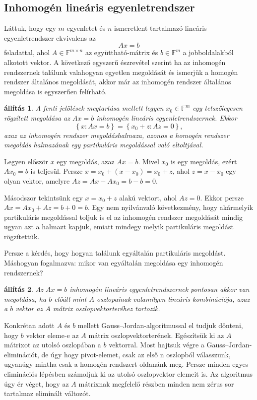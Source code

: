 \documentclass[9pt, a4paper, showtrims]{memoir}
\makeatletter
\renewenvironment{proof}[1][\proofname]
    {\par\pushQED{\qed}%
    \normalfont \topsep6\p@\@plus6\p@\relax
    \trivlist
    \item[\hskip\labelsep
        \itshape
    #1\@addpunct{:}]\ignorespaces}
    {\popQED\endtrivlist\@endpefalse}
\theoremstyle{plain}
\newtheorem{proposition}{állítás}[chapter]
\theoremstyle{remark}
\theoremstyle{definition}
\makeatother
\begin{document}
\subsection{Inhomogén lineáris egyenletrendszer}
Láttuk, hogy egy $m$ egyenletet és $n$ ismeretlent tartalmazó lineáris egyenletrendszer ekvivalens az 
\[
    Ax=b
\]
feladattal, ahol $A\in\mathbb{F}^{m\times n}$ az együttható-mátrix és $b\in\mathbb{F}^m$
a jobboldalakból alkotott vektor.
A következő egyszerű észrevétel szerint ha az inhomogén rendszernek találunk valahogyan egyetlen megoldását és ismerjük a homogén rendszer általános megoldását,
akkor már az inhomogén rendszer általános megoldása is egyszerűen felírható.
\begin{proposition}
    A fenti jelölések megtartása mellett
    legyen $x_0\in\mathbb{F}^m$ egy tetszőlegesen rögzített megoldása az $Ax=b$ inhomogén lineáris egyenletrendszernek.
    Ekkor
    \[
        \left\{ x:Ax=b \right\}
        =
        \left\{ x_0+z:Az=0 \right\},
    \]
    azaz az inhomogén rendszer megoldáshalmaza, 
    azonos a homogén rendszer megoldás halmazának egy partikuláris megoldással való 
    eltoltjával.
\end{proposition}
\begin{proof}
    Legyen először $x$ egy megoldás, azaz $Ax=b$. 
    Mivel $x_0$ is egy megoldás, ezért $Ax_{0}=b$ is teljesül.
    Persze $x=x_0+\left( x-x_0 \right)=x_0+z$, ahol $z=x-x_0$ egy olyan vektor,
    amelyre $Az=Ax-Ax_0=b-b=0$.

    Másodszor tekintsünk egy $x=x_0+z$ alakú vektort, ahol $Az=0$.
    Ekkor persze $Ax=Ax_0+Az=b+0=b$.
\end{proof}
Egy nem nyilvánvaló következmény, 
hogy akármelyik partikuláris megoldással toljuk is el az
inhomogén rendszer megoldását mindig ugyan azt a halmazt kapjuk, 
emiatt mindegy melyik partikuláris megoldást rögzítettük.

Persze a kérdés, hogy hogyan találunk egyáltalán partikuláris megoldást.
Máshogyan fogalmazva: mikor van egyáltalán megoldása egy inhomogén rendszernek?
\begin{proposition}
    Az $Ax=b$ inhomogén lineáris egyenletrendszernek pontosan akkor van megoldása, 
    ha $b$ előáll mint $A$ oszlopainak valamilyen lineáris kombinációja, 
    azaz a $b$ vektor az $A$ mátrix oszlopvektorteréhez tartozik.
\end{proposition}
Konkrétan adott $A$ és $b$ mellett Gauss--Jordan-algoritmussal  el tudjuk dönteni, hogy
$b$ vektor eleme-e az $A$ mátrix oszlopvektorterének.
Egészítsük ki az $A$ mátrixot az utolsó oszlopában a $b$ vektorral.
Most hajtsuk végre a Gauss--Jordan-eliminációt, de úgy hogy pivot-elemet,
csak az első n oszlopból válasszunk, ugyanúgy mintha csak a homogén rendszert oldanánk meg.
Persze minden egyes eliminációs lépésben számoljuk ki az utolsó oszlopvektor elemeit is.
Az algoritmus úgy ér véget, 
hogy az $A$ mátrixnak megfelelő részben minden nem zérus sor tartalmaz eliminált változót.
\end{document}
